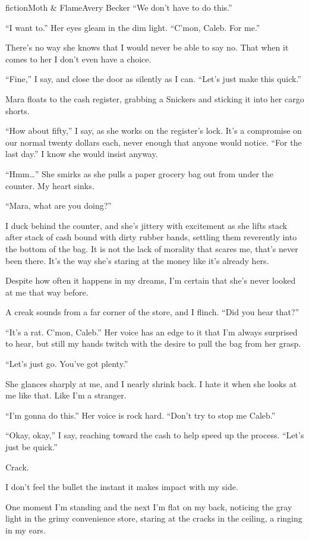 \begin{prose}{fiction}{Moth \& Flame}{Avery Becker}
“We don't have to do this.”\par
“I want to.” Her eyes gleam in the dim light. “C'mon, Caleb. For me.” \par
There's no way she knows that I would never be able to say no. That when it comes to her I don't even have a choice.\par
“Fine,” I say, and close the door as silently as I can. “Let's just make this quick.” \par
Mara floats to the cash register, grabbing a Snickers and sticking it into her cargo shorts. \par
“How about fifty,” I say, as she works on the register's lock. It's a compromise on our normal twenty dollars each, never enough that anyone would notice. “For the last day.” I know she would insist anyway. \par
“Hmm…” She smirks as she pulls a paper grocery bag out from under the counter. My heart sinks.\par
“Mara, what are you doing?” \par
I duck behind the counter, and she's jittery with excitement as she lifts stack after stack of cash bound with dirty rubber bands, settling them reverently into the bottom of the bag. It is not the lack of morality that scares me, that's never been there. It's the way she's staring at the money like it's already hers.\par
Despite how often it happens in my dreams, I'm certain that she's never looked at me that way before. \par
A creak sounds from a far corner of the store, and I flinch. “Did you hear that?”\par
“It's a rat. C'mon, Caleb.” Her voice has an edge to it that I'm always surprised to hear, but still my hands twitch with the desire to pull the bag from her grasp.\par
“Let's just go. You've got plenty.” \par
She glances sharply at me, and I nearly shrink back. I hate it when she looks at me like that. Like I'm a stranger. \par
“I'm gonna do this.” Her voice is rock hard. “Don't try to stop me Caleb.” \par
“Okay, okay,” I say, reaching toward the cash to help speed up the process. “Let's just be quick.”\par
Crack.\par
I don't feel the bullet the instant it makes impact with my side. \par
One moment I'm standing and the next I'm flat on my back, noticing the gray light in the grimy convenience store, staring at the cracks in the ceiling, a ringing in my ears.\par

\end{prose}
